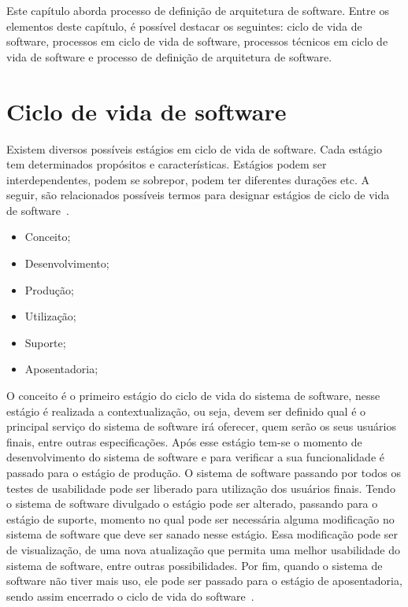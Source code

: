 Este capítulo aborda processo de definição de arquitetura de software. Entre os elementos deste capítulo, é possível destacar os seguintes: ciclo de vida de software, processos em ciclo de vida de software, processos técnicos em ciclo de vida de software e processo de definição de arquitetura de software.

\section{Ciclo de vida de software}

Existem diversos possíveis estágios em ciclo de vida de software. Cada estágio tem determinados propósitos e características. Estágios podem ser interdependentes, podem se sobrepor, podem ter diferentes durações etc. A seguir, são relacionados possíveis termos para designar estágios de ciclo de vida de software~\cite{ISO_247483}. 

\begin{itemize}
    \item Conceito;
    \item Desenvolvimento;
    \item Produção;
    \item Utilização;
    \item Suporte;
    \item Aposentadoria;
\end{itemize}

O conceito é o primeiro estágio do ciclo de vida do sistema de software, nesse estágio é realizada a contextualização, ou seja, devem ser definido qual é o principal serviço do sistema de software irá oferecer, quem serão os seus usuários finais, entre outras especificações. Após esse estágio tem-se o momento de desenvolvimento do sistema de software e para verificar a sua funcionalidade é passado para o estágio de produção. O sistema de software passando por todos os testes de usabilidade pode ser liberado para utilização dos usuários finais. Tendo o sistema de software divulgado o estágio pode ser alterado, passando para o estágio de suporte, momento no qual pode ser necessária alguma modificação no sistema de software que deve ser sanado nesse estágio. Essa modificação pode ser de visualização, de uma nova atualização que permita uma melhor usabilidade do sistema de software, entre outras possibilidades. Por fim, quando o sistema de software não tiver mais uso, ele pode ser passado para o estágio de aposentadoria, sendo assim encerrado o ciclo de vida do software~\cite{ISO_247483}.

